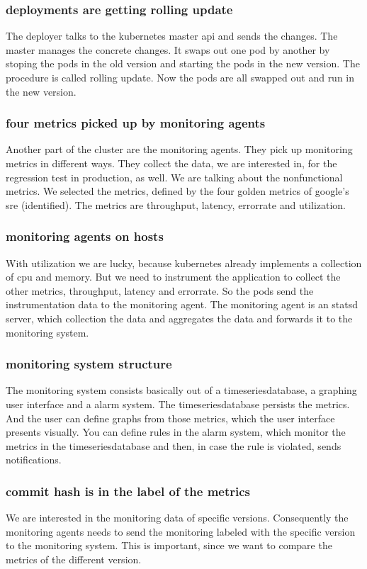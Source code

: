 \subsubsection{deployments are getting rolling update}
The deployer talks to the kubernetes master api and sends the changes. The master manages
the concrete changes. It swaps out one pod by another by stoping the pods in the old
version and starting the pods in the new version. The procedure is called rolling
update. Now the pods are all swapped out and run in the new version.

\subsubsection{four metrics picked up by monitoring agents}
Another part of the cluster are the monitoring agents. They pick up monitoring metrics in
different ways. They collect the data, we are interested in, for the regression test in
production, as well. We are talking about the nonfunctional metrics. We selected the
metrics, defined by the four golden metrics of google's sre (identified). The metrics are
throughput, latency, errorrate and utilization.

\subsubsection{monitoring agents on hosts}
With utilization we are lucky, because kubernetes already implements a collection of cpu
and memory. But we need to instrument the application to collect the other metrics,
throughput, latency and errorrate. So the pods send the instrumentation data to the
monitoring agent. The monitoring agent is an statsd server, which collection the data and
aggregates the data and forwards it to the monitoring system.

\subsubsection{monitoring system structure}
The monitoring system consists basically out of a timeseriesdatabase, a graphing user
interface and a alarm system. The timeseriesdatabase persists the metrics. And the user
can define graphs from those metrics, which the user interface presents visually. You can
define rules in the alarm system, which monitor the metrics in the timeseriesdatabase and
then, in case the rule is violated, sends notifications.

\subsubsection{commit hash is in the label of the metrics }
We are interested in the monitoring data of specific versions. Consequently the monitoring
agents needs to send the monitoring labeled with the specific version to the monitoring
system. This is important, since we want to compare the metrics of the different version.

